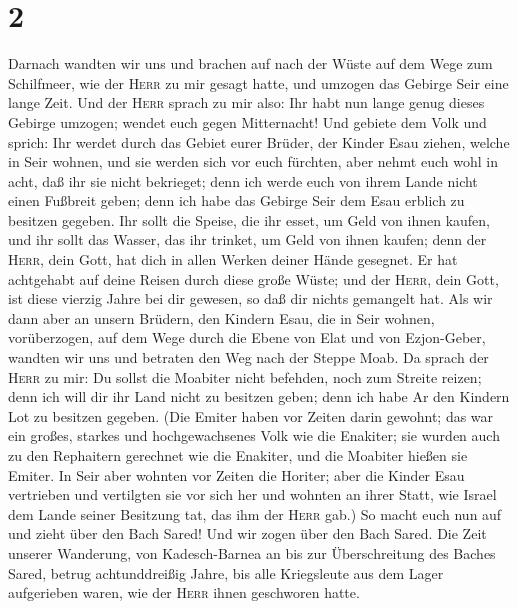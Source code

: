 \hypertarget{section-1}{%
\section{2}\label{section-1}}

 Darnach wandten wir uns und brachen auf nach der Wüste
auf dem Wege zum Schilfmeer, wie der \textsc{Herr} zu mir gesagt hatte,
und umzogen das Gebirge Seir eine lange Zeit.  Und der
\textsc{Herr} sprach zu mir also:  Ihr habt nun lange
genug dieses Gebirge umzogen; wendet euch gegen Mitternacht!
 Und gebiete dem Volk und sprich: Ihr werdet durch das
Gebiet eurer Brüder, der Kinder Esau ziehen, welche in Seir wohnen, und
sie werden sich vor euch fürchten, aber nehmt euch wohl in acht,
 daß ihr sie nicht bekrieget; denn ich werde euch von
ihrem Lande nicht einen Fußbreit geben; denn ich habe das Gebirge Seir
dem Esau erblich zu besitzen gegeben.  Ihr sollt die
Speise, die ihr esset, um Geld von ihnen kaufen, und ihr sollt das
Wasser, das ihr trinket, um Geld von ihnen kaufen;  denn
der \textsc{Herr}, dein Gott, hat dich in allen Werken deiner Hände
gesegnet. Er hat achtgehabt auf deine Reisen durch diese große Wüste;
und der \textsc{Herr}, dein Gott, ist diese vierzig Jahre bei dir
gewesen, so daß dir nichts gemangelt hat.  Als wir dann
aber an unsern Brüdern, den Kindern Esau, die in Seir wohnen,
vorüberzogen, auf dem Wege durch die Ebene von Elat und von Ezjon-Geber,
wandten wir uns und betraten den Weg nach der Steppe Moab.
 Da sprach der \textsc{Herr} zu mir: Du sollst die
Moabiter nicht befehden, noch zum Streite reizen; denn ich will dir ihr
Land nicht zu besitzen geben; denn ich habe Ar den Kindern Lot zu
besitzen gegeben.  (Die Emiter haben vor Zeiten darin
gewohnt; das war ein großes, starkes und hochgewachsenes Volk wie die
Enakiter;  sie wurden auch zu den Rephaitern gerechnet
wie die Enakiter, und die Moabiter hießen sie Emiter.  In
Seir aber wohnten vor Zeiten die Horiter; aber die Kinder Esau
vertrieben und vertilgten sie vor sich her und wohnten an ihrer Statt,
wie Israel dem Lande seiner Besitzung tat, das ihm der \textsc{Herr}
gab.)  So macht euch nun auf und zieht über den Bach
Sared! Und wir zogen über den Bach Sared.  Die Zeit
unserer Wanderung, von Kadesch-Barnea an bis zur Überschreitung des
Baches Sared, betrug achtunddreißig Jahre, bis alle Kriegsleute aus dem
Lager aufgerieben waren, wie der \textsc{Herr} ihnen geschworen hatte.
